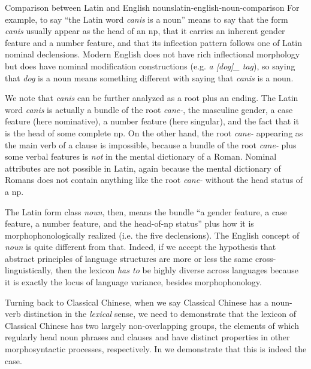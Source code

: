 \documentclass[UTF8, a4paper, oneside, scheme=plain, 12pt]{ctexrep}
\newcommand*{\term}[1]{\emph{#1}}
\newcommand{\form}[1]{\emph{#1}}
\begin{document}
\begin{theorybox}{Comparison between Latin and English nouns}{latin-english-noun-comparison}
    For example, to say ``the Latin word \form{canis} is a noun'' 
    means to say that the form \form{canis} usually appear as the head of an \ac{np},
    that it carries an inherent gender feature and a number feature,
    and that its inflection pattern follows one of Latin nominal declensions.
    Modern English does not have rich inflectional morphology
    but does have nominal modification constructions (e.g. \form{a [dog]_{} tag}),
    so saying that \form{dog} is a noun means something different with 
    saying that \form{canis} is a noun.

    We note that \form{canis} can be further analyzed as a root plus an ending.
    The Latin word \form{canis} is actually a bundle of the root 
    \form{cane-}, the masculine gender, a case feature (here nominative),
    a number feature (here singular),
    and the fact that it is the head of some complete \ac{np}.
    On the other hand, the root \form{cane-} appearing as the main verb of a clause is impossible,
    because a bundle of the root \form{cane-} plus some verbal features
    is \emph{not} in the mental dictionary of a Roman.
    Nominal attributes are not possible in Latin,
    again because the mental dictionary of Romans does not contain anything like
    the root \form{cane-} without the head status of a \ac{np}.

    The Latin form class \term{noun}, then,
    means the bundle ``a gender feature, a case feature, a number feature, and the head-of-\ac{np} status''
    plus how it is morphophonologically realized (i.e. the five declensions).
    The English concept of \term{noun} is quite different from that.
    Indeed, if we accept the hypothesis that abstract principles of language structures 
    are more or less the same cross-linguistically,
    then the lexicon \emph{has to} be highly diverse across languages
    because it is exactly the locus of language variance, besides morphophonology.
    
    Turning back to Classical Chinese, when we say Classical Chinese has a noun-verb distinction in the \emph{lexical} sense,
    we need to demonstrate that the lexicon of Classical Chinese has two largely non-overlapping groups,
    the elements of which regularly head noun phrases and clauses and have distinct properties in other morphosyntactic processes, respectively.
    In  we demonstrate that this is indeed the case.
\end{theorybox}
\end{document}
